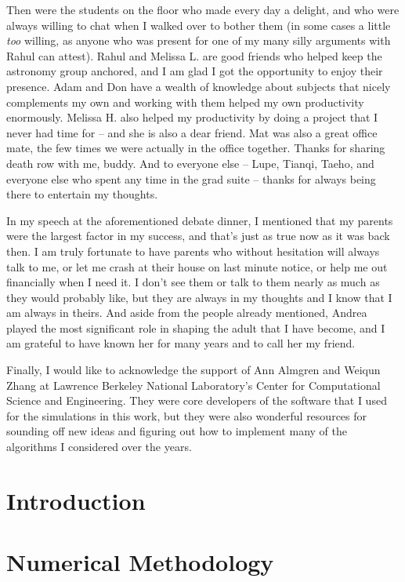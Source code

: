 \documentclass[12pt]{article}
\begin{document}
Then were the students on the floor who made every day a delight, and who
were always willing to chat when I walked over to bother them (in some cases
a little \textit{too} willing, as anyone who was present for one of my many
silly arguments with Rahul can attest). Rahul and Melissa L. are good friends 
who helped keep the astronomy group anchored, and I am glad I got the 
opportunity to enjoy their presence. Adam and Don have a wealth of knowledge 
about subjects that nicely complements my own and working with them helped my 
own productivity enormously. Melissa H. also helped my productivity by doing 
a project that I never had time for -- and she is also a dear friend. Mat 
was also a great office mate, the few times we were actually in the office 
together. Thanks for sharing death row with me, buddy. And to everyone else
-- Lupe, Tianqi, Taeho, and everyone else who spent any time in the grad 
suite -- thanks for always being there to entertain my thoughts.

In my speech at the aforementioned debate dinner, I mentioned that my 
parents were the largest factor in my success, and that's just as true 
now as it was back then. I am truly fortunate to have parents who without 
hesitation will always talk to me, or let me crash at their house on 
last minute notice, or help me out financially when I need it. I don't 
see them or talk to them nearly as much as they would probably like, 
but they are always in my thoughts and I know that I am always in theirs.
And aside from the people already mentioned, Andrea played the most significant 
role in shaping the adult that I have become, and I am grateful to have known 
her for many years and to call her my friend.

Finally, I would like to acknowledge the support of Ann Almgren and Weiqun 
Zhang at Lawrence Berkeley National Laboratory's Center for Computational 
Science and Engineering. They were core developers of the software that 
I used for the simulations in this work, but they were also wonderful resources 
for sounding off new ideas and figuring out how to implement many of the 
algorithms I considered over the years.

\newpage
{}
\section{Introduction}
\label{sec:introduction}

\cite{wdmergerI}


\newpage
\section{Numerical Methodology}
\label{sec:methodology}
\end{document}
